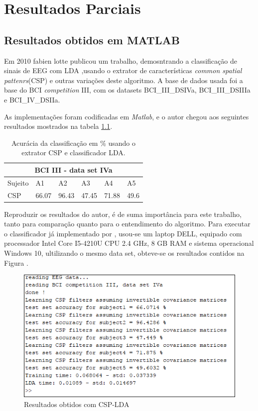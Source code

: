 \chapter[Resultados Parcias ]{Resultados Parciais}

\section{Resultados obtidos em MATLAB}
Em 2010 fabien lotte publicou um trabalho, demosntrando a classificação de sinais de EEG com LDA \cite{F.Lotte},usando o extrator de características \textit{common spatial pattenrs}(CSP) e outras
variações deste algoritmo. A base de dados usada foi a base do BCI \textit{competition} III, com os datasets BCI\_III\_DSIVa, BCI\_III\_DSIIIa e BCI\_IV\_DSIIa. 

As implementações foram codificadas em \textit{Matlab}, e o autor chegou aos seguintes resultados mostrados na tabela \ref{resultlotte}.

\begin{table}[h]
\centering
\caption{Acurácia da classificação em \% usando o extrator CSP e classificador LDA.}
\label{resultlotte}
\begin{tabular}{|l|l|l|l|l|l|}
\hline
\multicolumn{6}{|c|}{BCI III -  data set IVa}  \\ \hline
Sujeito & A1    & A2    & A3    & A4    & A5   \\ \hline
CSP     & 66.07 & 96.43 & 47.45 & 71.88 & 49.6 \\ \hline
\end{tabular}
\end{table}
 
Reproduzir os resultados do autor, é de suma importância para este trabalho, tanto para comparação quanto para o entendimento do algoritmo. Para executar o classificador já implementado por \cite{F.Lotte}, usou-se um laptop DELL, equipado com processador Intel Core I5-4210U CPU 2.4 GHz, 8 GB RAM e sistema operacional Windows 10,  ultilizando o mesmo data set, obteve-se os resultados contidos na Figura . 

\begin{figure}[h]
	\centering
	\includegraphics[keepaspectratio=true,scale=0.75]{figuras/resultados_csp_lda.png}
	\caption{Resultados obtidos  com CSP-LDA}
	\label{resultadoLotte}
\end{figure}

